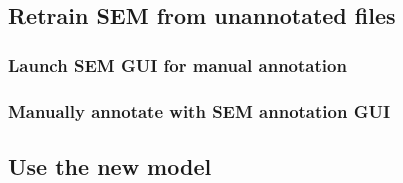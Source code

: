 \documentclass[12pt]{article}
\begin{document}
        \subsection{Retrain SEM from unannotated files}
        \label{sec:retrain-sem-unannotated}
        
        
            \subsubsection{Launch SEM GUI for manual annotation}
            \label{subsubsec:launch-sem-annotation-gui}
            
        
            \subsubsection{Manually annotate with SEM annotation GUI}
            \label{subsubsec:manually-annotate-with-sem}
            
        
        \subsection{Use the new model}
        \label{subsec:use-new-model}
        
    
    
    
\end{document}
